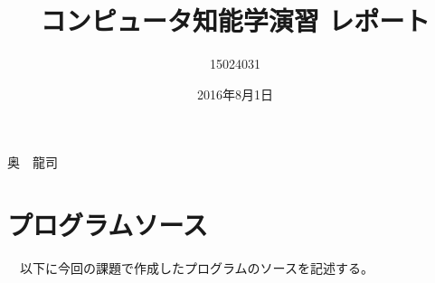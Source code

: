 \documentclass[a4j,titlepage]{jarticle}
\begin{document}

\title{コンピュータ知能学演習 レポート}

\author{15024031}{奥　龍司}

\date{2016年8月1日}
\maketitle



\section{プログラムソース}
　以下に今回の課題で作成したプログラムのソースを記述する。
\end{document}
